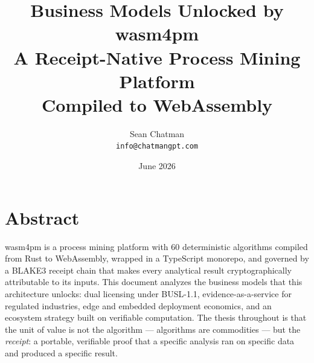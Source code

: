 \documentclass[11pt,a4paper,oneside]{book}
\title{\Huge Business Models Unlocked by wasm4pm\\[1em]
\Large A Receipt-Native Process Mining Platform\\
Compiled to WebAssembly}
\author{Sean Chatman\\\texttt{info@chatmangpt.com}}
\date{June 2026}
\begin{document}
\frontmatter
\maketitle

\chapter*{Abstract}
wasm4pm is a process mining platform with 60 deterministic algorithms compiled
from Rust to WebAssembly, wrapped in a TypeScript monorepo, and governed by a
BLAKE3 receipt chain that makes every analytical result cryptographically
attributable to its inputs. This document analyzes the business models that
this architecture unlocks: dual licensing under BUSL-1.1, evidence-as-a-service
for regulated industries, edge and embedded deployment economics, and an
ecosystem strategy built on verifiable computation. The thesis throughout is
that the unit of value is not the algorithm --- algorithms are commodities ---
but the \emph{receipt}: a portable, verifiable proof that a specific analysis
ran on specific data and produced a specific result.

\tableofcontents

\mainmatter








\end{document}
